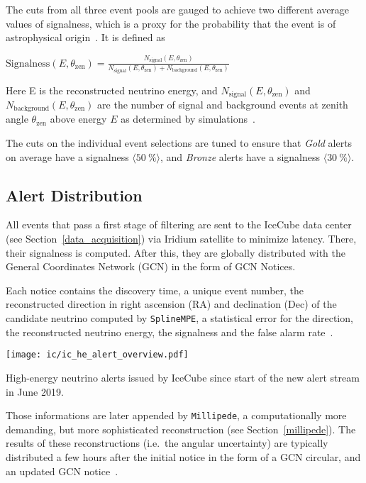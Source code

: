 The cuts from all three event pools are gauged to achieve two different average values of signalness, which is a proxy for the probability that the event is of astrophysical origin~\cite{Abbasi2023}. It is defined as
\begin{definition}\label{signalness_def}
    $\text{Signalness}(E,\theta_\text{zen}) = \frac{N_\text{signal}(E,\theta_\text{zen})}{N_\text{signal}(E,\theta_\text{zen})+N_\text{background}(E,\theta_\text{zen})}$
\end{definition}
Here E is the reconstructed neutrino energy, and $N_\text{signal}(E,\theta_\text{zen})$ and $N_\text{background}(E,\theta_\text{zen})$ are the number of signal and background events at zenith angle $\theta_\text{zen}$ above energy $E$ as determined by simulations~\cite{Abbasi2023}.

The cuts on the individual event selections are tuned to ensure that \textit{Gold} alerts on average have a signalness $\langle \SI{50}{\percent} \rangle$, and \textit{Bronze} alerts have a signalness $\langle \SI{30}{\percent} \rangle$.

\subsection{Alert Distribution} \label{ic_alerts}
All events that pass a first stage of filtering are sent to the IceCube data center (see Section~\ref{data_acquisition}) via Iridium satellite to minimize latency. There, their signalness is computed. After this, they are globally distributed with the General Coordinates Network (GCN) in the form of GCN Notices.

Each notice contains the discovery time, a unique event number, the reconstructed direction in right ascension (RA) and declination (Dec) of the candidate neutrino computed by \texttt{SplineMPE}, a statistical error for the direction, the reconstructed neutrino energy, the signalness and the false alarm rate~\cite{Blaufuss2019}.

\begin{marginfigure}
    \texttt{[image: ic/ic\_he\_alert\_overview.pdf]}
    \caption[IceCube alert overview]{High-energy neutrino alerts issued by IceCube since start of the new alert stream in June 2019.}
\end{marginfigure}

Those informations are later appended by \texttt{Millipede}, a computationally more demanding, but more sophisticated reconstruction (see Section~\ref{millipede}). The results of these reconstructions (i.e.\ the angular uncertainty) are typically distributed a few hours after the initial notice in the form of a GCN circular, and an updated GCN notice~\cite{Blaufuss2019}.

